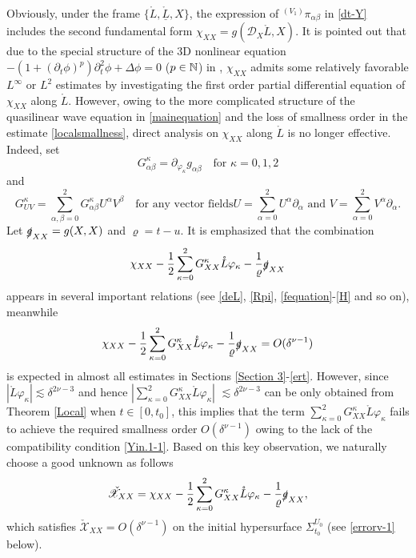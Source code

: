 \documentclass[11pt,twoside]{article}
\def\vp{\varphi}
\def\f{\frac}
\def\p{\partial}
\def\dps{\displaystyle}
\begin{document}
Obviously, under the frame $\{\mathring{L}, \mathring{\underline{L}}, X\}$, the expression of ${}^{(V_1)}\pi_{\alpha\beta}$
in \eqref{dt-Y} includes the second fundamental form $\chi_{XX} = g(\mathscr{D}_X \mathring{L}, X)$.
It is pointed out that due to the special structure of the 3D nonlinear equation $-(1+(\p_t\phi)^p)\p_t^2\phi+\Delta\phi=0$
($p\in\Bbb N$) in \cite{M-Y,L-Y}, $\chi_{XX}$ admits some relatively favorable $L^\infty$ or $L^2$ estimates by investigating the
first order partial differential equation of $\chi_{XX}$ along $\mathring{L}$.
However, owing to the more complicated structure of the quasilinear wave equation in \eqref{mainequation} and
the loss of smallness order in the estimate \eqref{localsmallness}, direct analysis on $\chi_{XX}$
along $\mathring{L}$ is no longer effective. Indeed, set
\begin{equation}\label{FG-Y}
G_{\alpha\beta}^{\kappa}= \partial_{\vp_{\kappa}} g_{\alpha\beta}\quad \text{for $\kappa=0,1,2$}
\end{equation}
and
\begin{equation}\label{FG-Y0}
G_{UV}^{\kappa} = \dps\sum_{\alpha,\beta=0}^2G_{\alpha\beta}^{\kappa} U^{\alpha} V^{\beta} \quad\text{for any vector fields
$U = \dps\sum_{\alpha=0}^2U^{\alpha} \partial_{\alpha}$ and $V = \dps\sum_{\alpha=0}^2V^{\alpha} \partial_{\alpha}$}.
\end{equation}
Let $\slashed g_{XX}=g(X, X)$ and $\varrho={t}-u$.
It is emphasized that the combination
\begin{equation}\label{FG-Y1}
\chi_{XX}-\frac{1}{2}\dps\sum_{\kappa=0}^2G_{XX}^\kappa\mathring{L}\vp_\kappa-\f{1}{\varrho}\slashed g_{XX}
\end{equation}
appears in several important relations (see \eqref{deL}, \eqref{Rpi}, \eqref{fequation}-\eqref{H} and so on), meanwhile
\begin{equation}\label{FG-Y001}
\chi_{XX}-\frac{1}{2}\dps\sum_{\kappa=0}^2G_{XX}^\kappa\mathring{L}\vp_\kappa-\f{1}{\varrho}\slashed g_{XX}=O(\delta^{\nu-1})
\end{equation}
is expected in almost all estimates in Sections \ref{Section 3}-\ref{ert}.
However, since  $|\mathring{L}\vp_\kappa| \lesssim \delta^{2\nu-3}$ and hence $|\dps\sum_{\kappa=0}^2G_{XX}^\kappa\mathring{L}\vp_\kappa|$
$\lesssim \delta^{2\nu-3}$ can be only obtained from Theorem \ref{Local} when $t\in [0, t_0]$, this implies that the term $\dps\sum_{\kappa=0}^2G_{XX}^\kappa\mathring{L}\vp_\kappa$
fails to achieve the required smallness order $O(\delta^{\nu-1})$ owing to the lack of the compatibility condition \eqref{Yin.1-1}.
Based on this key observation, we naturally choose a good unknown as follows
\begin{equation}\label{FG-Y2}
\check{\mathscr{X}}_{XX}=\chi_{XX}- \frac{1}{2}\dps\sum_{\kappa=0}^2G_{XX}^\kappa\mathring{L}\vp_\kappa-\f{1}{\varrho}\slashed g_{XX},
\end{equation}
which satisfies $\check{\mathscr{X}}_{XX}=O(\delta^{\nu-1})$  on the initial hypersurface $\Sigma_{t_0}^{U_0}$
(see \eqref{errorv-1} below).
\end{document}
